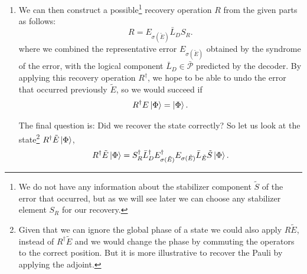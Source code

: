 \begin{enumerate}
Each coset of the stabilizer group in the centralizer realizes a logical operator on the encoded qubit.
Asking which coset the error belongs to is asking the question, which logical error $\bar{L}_{\tilde{E}} \in \bar{\mathcal{P}}$ the error contains.
Here we adapt the rewriting introduced in equation \eqref{eq:pauli_rewriting_stabilizer_formalism} to the error that occurred 
\begin{equation}
    \tilde{E} = E_{\sigma(\tilde{E})}\bar{L}_{\tilde{E}}\tilde{S}.
\end{equation}

The problem of determining which coset of the stabilizer group the error belongs to, or which logical operator it includes, is the so-called decoding problem.
It is handled by so-called decoders\footnote{ 
We will go into more detail about possible approaches to decode a syndrome in the following section \ref{sec:decoding_problem_general}.
}.
For now, let's assume our decoder infers the coset of the stabilizer of the error that occurred and therefore predicts a correction.
This prediction can be represented as a logical operator, which we refer to as $\bar{L}_D\in\bar{\mathcal{P}}$.

\item We can then construct a possible\footnote{
We do not have any information about the stabilizer component $\tilde{S}$ of the error that occurred, but as we will see later we can choose any stabilizer element $S_R$ for our recovery.
} recovery operation $R$ from the given parts as follows:
\begin{equation}
    R = E_{\sigma(\tilde{E})}\bar{L}_{D} S_R.
\end{equation}
where we combined the representative error $E_{\sigma(\tilde{E})}$ obtained by the syndrome of the error, with the logical component $\bar{L}_D \in \bar{\mathcal{P}}$ predicted by the decoder.
By applying this recovery operation $R^\dag$, we hope to be able to undo the error that occurred previously $\tilde{E}$, so we would succeed if  
\begin{equation}
    R^\dag E \ket{\Phi} = \ket{\Phi}.
\end{equation}

The final question is: 
Did we recover the state correctly?
So let us look at the state\footnote{
    Given that we can ignore the global phase of a state we could also apply $R\tilde{E}$, instead of $R^\dag\tilde{E}$ and we would change the phase by commuting the operators to the correct position.
    But it is more illustrative to recover the Pauli by applying the adjoint.
    } $R^\dag \tilde{E} \ket{\Phi}$,
\begin{equation}
    R^\dag \tilde{E} \ket{\Phi} = S_R^\dag \bar{L}_D^\dag E_{\sigma(\tilde{E})}^\dag E_{\sigma(\tilde{E})}\bar{L}_{\tilde{E}}\tilde{S}\ket{\Phi}.
\end{equation}


\end{enumerate}
